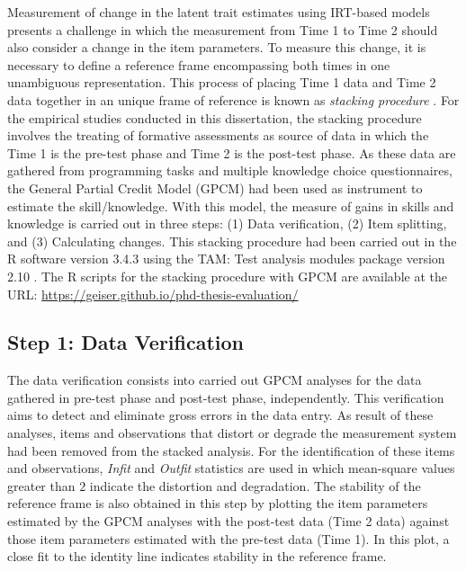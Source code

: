 Measurement of change in the latent trait estimates using IRT-based models presents a challenge in which the measurement from Time 1 to Time 2 should also consider a change in the item parameters. To measure this change, it is necessary to define a reference frame encompassing both times in one unambiguous representation. This process of placing Time 1 data and Time 2 data together in an unique frame of reference is known as \emph{stacking procedure} \cite{Wright2003}. For the empirical studies conducted in this dissertation, the stacking procedure involves the treating of formative assessments as source of data in which the Time 1 is the pre-test phase and Time 2 is the post-test phase. As these data are gathered from programming tasks and multiple knowledge choice questionnaires, the General Partial Credit Model (GPCM) \cite{MastersWright1996} had been used as instrument to estimate the skill/knowledge. With this model, the measure of gains in skills and knowledge is carried out in three steps: (1) Data verification, (2) Item splitting, and (3) Calculating changes. This stacking procedure had been carried out in the R software version 3.4.3 \cite{RCoreTeam2017} using the TAM: Test analysis modules package version 2.10 \cite{RobitzschKieferWu2018}. The R scripts for the stacking procedure with GPCM are available at the URL: \url{https://geiser.github.io/phd-thesis-evaluation/}

\subsection{Step 1: Data Verification}

The data verification consists into carried out GPCM analyses for the data gathered in pre-test phase and post-test phase, independently. This verification aims to detect and eliminate gross errors in the data entry. As result of these analyses, items and observations that distort or degrade the measurement system had been removed from the stacked analysis. For the identification of these items and observations, \emph{Infit} and \emph{Outfit} statistics are used in which mean-square values greater than $2$ indicate the distortion and degradation. The stability of the reference frame is also obtained in this step by plotting the item parameters estimated by the GPCM analyses with the post-test data (Time 2 data) against those item parameters estimated with the pre-test data (Time 1). In this plot, a close fit to the identity line indicates stability in the reference frame. %


